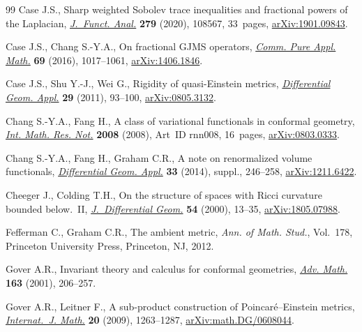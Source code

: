 \documentclass[pdftex]{sigma}
\numberwithin{equation}{section}
\begin{document}
\begin{thebibliography}{99}
Case J.S., Sharp weighted {S}obolev trace inequalities and fractional powers of
 the {L}aplacian, \href{https://doi.org/10.1016/j.jfa.2020.108567}{\textit{J.~Funct. Anal.}} \textbf{279} (2020), 108567, 33~pages,
 \href{https://arxiv.org/abs/1901.09843}{arXiv:1901.09843}.

Case J.S., Chang S.-Y.A., On fractional {GJMS} operators, \href{https://doi.org/10.1002/cpa.21564}{\textit{Comm. Pure
 Appl. Math.}} \textbf{69} (2016), 1017--1061, \href{https://arxiv.org/abs/1406.1846}{arXiv:1406.1846}.

Case J.S., Shu Y.-J., Wei G., Rigidity of quasi-{E}instein metrics,
 \href{https://doi.org/10.1016/j.difgeo.2010.11.003}{\textit{Differential Geom. Appl.}} \textbf{29} (2011), 93--100,
 \href{https://arxiv.org/abs/0805.3132}{arXiv:0805.3132}.

Chang S.-Y.A., Fang H., A class of variational functionals in conformal
 geometry, \href{https://doi.org/10.1093/imrn/rnn008}{\textit{Int. Math. Res. Not.}} \textbf{2008} (2008), Art~ID rnn008,
 16~pages, \href{https://arxiv.org/abs/0803.0333}{arXiv:0803.0333}.

Chang S.-Y.A., Fang H., Graham C.R., A note on renormalized volume functionals,
 \href{https://doi.org/10.1016/j.difgeo.2013.10.001}{\textit{Differential Geom. Appl.}} \textbf{33} (2014), suppl., 246--258,
 \href{https://arxiv.org/abs/1211.6422}{arXiv:1211.6422}.

Cheeger J., Colding T.H., On the structure of spaces with {R}icci curvature
 bounded below.~{II}, \href{https://doi.org/10.4310/jdg/1214342145}{\textit{J.~Differential Geom.}} \textbf{54} (2000),
 13--35, \href{https://arxiv.org/abs/1805.07988}{arXiv:1805.07988}.

Fefferman C., Graham C.R., The ambient metric, \textit{Ann. of Math. Stud.},
 Vol.~178, Princeton University Press, Princeton, NJ, 2012.

Gover A.R., Invariant theory and calculus for conformal geometries,
 \href{https://doi.org/10.1006/aima.2001.1999}{\textit{Adv. Math.}} \textbf{163} (2001), 206--257.

Gover A.R., Leitner F., A sub-product construction of {P}oincar\'e--{E}instein
 metrics, \href{https://doi.org/10.1142/S0129167X09005753}{\textit{Internat.~J. Math.}} \textbf{20} (2009), 1263--1287,
 \href{https://arxiv.org/abs/math.DG/0608044}{arXiv:math.DG/0608044}.


\end{thebibliography}
\end{document}
